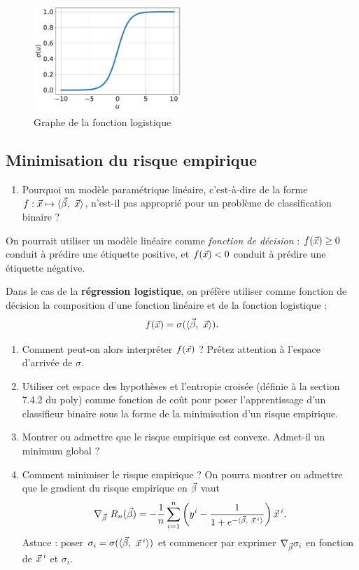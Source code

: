 \documentclass[french,11pt]{article}
\begin{document}
\begin{figure}[h]
  \centering
  \includegraphics[width=0.5\textwidth]{figures/logistic}
  \caption{Graphe de la fonction logistique}
  \label{fig:logistic}
\end{figure}

\subsection{Minimisation du risque empirique}
\label{sec:mre_logistic}
\begin{enumerate}
\item Pourquoi un modèle paramétrique linéaire, c'est-à-dire de la forme
  $f: \xx \mapsto \innerproduct{\bbeta,~\xx}$, n'est-il pas approprié pour un problème de
  classification binaire ?
\end{enumerate}

On pourrait utiliser un modèle linéaire comme \textit{fonction de décision} :
$f(\xx) \geq 0$ conduit à prédire une étiquette positive, et $f(\xx) < 0$
conduit à prédire une étiquette négative.

Dans le cas de la \textbf{régression logistique}, on préfère utiliser comme
fonction de décision la composition d'une fonction linéaire et de la fonction
logistique :
\begin{equation}
  f(\xx) = \sigma(\innerproduct{\bbeta,~\xx}).
  \label{eq:logistic_model}
\end{equation}
\begin{enumerate}[resume]
\item 
  Comment peut-on alors interpréter $f(\xx)$ ? Prêtez attention à l'espace
  d'arrivée de $\sigma$.
\item Utiliser cet espace des hypothèses et l'entropie croisée
  (définie à la section 7.4.2 du poly) comme fonction de coût pour poser l'apprentissage d'un
  classifieur binaire sous la forme de la minimisation d'un risque empirique.
\item Montrer ou admettre que le risque empirique est convexe. Admet-il un minimum global ? 
\item Comment minimiser le risque empirique ? On pourra montrer ou admettre que le gradient du risque empirique en $\bbeta$ vaut 
    \begin{equation*}
      \nabla_{\bbeta}~R_n(\bbeta) = - \frac1n \sum_{i=1}^n \left(y^i - \frac1{1 + e^{-\innerproduct{\bbeta,~\xx^i}}} \right) \xx^i.
    \end{equation*}
    Astuce : poser
    $\sigma_i = \sigma(\innerproduct{\bbeta,~\xx^i})$ et commencer par exprimer
    $\nabla_{\bbeta} \sigma_i$ en fonction de $\xx^i$ et $\sigma_i$.
\end{enumerate}
\end{document}
